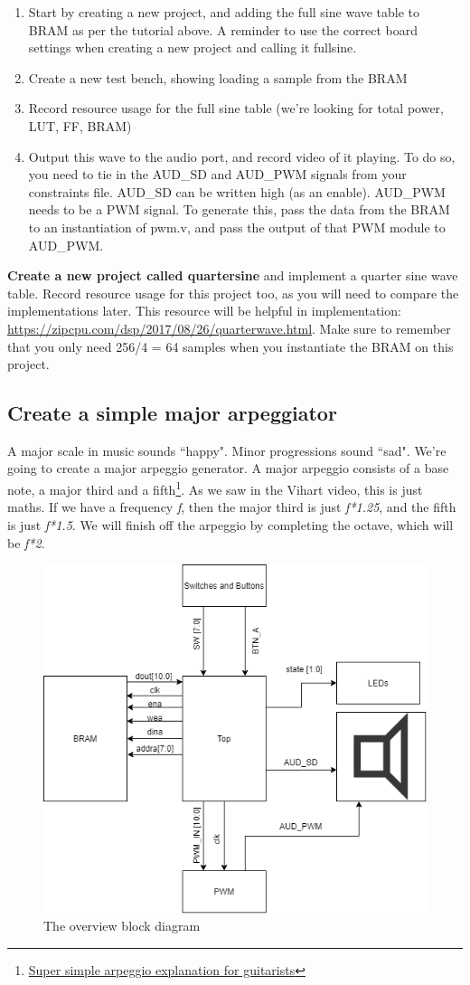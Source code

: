 \begin{enumerate}
    \item Start by creating a new project, and adding the full sine wave table to BRAM as per the tutorial above. A reminder to use the correct board settings when creating a new project and calling it fullsine.
    \item Create a new test bench, showing loading a sample from the BRAM
    \item Record resource usage for the full sine table (we're looking for total power, LUT, FF, BRAM)
    \item Output this wave to the audio port, and record video of it playing. To do so, you need to tie in the AUD\_SD and AUD\_PWM signals from your constraints file. AUD\_SD can be written high (as an enable). AUD\_PWM needs to be a PWM signal. To generate this, pass the data from the BRAM to an instantiation of pwm.v, and pass the output of that PWM module to AUD\_PWM.
\end{enumerate}
\textbf{Create a new project called quartersine} and implement a quarter sine wave table. Record resource usage for this project too, as you will need to compare the implementations later. This resource will be helpful in implementation: \href{https://zipcpu.com/dsp/2017/08/26/quarterwave.html}{https://zipcpu.com/dsp/2017/08/26/quarterwave.html}. Make sure to remember that you only need 256/4 = 64 samples when you instantiate the BRAM on this project.


\subsection{Create a simple major arpeggiator}
A major scale in music sounds ``happy". Minor progressions sound ``sad". We're going to create a major arpeggio generator.
A major arpeggio consists of a base note, a major third and a fifth\footnote{\href{https://www.superprof.com.au/blog/arpeggios-guitar-tips/}{Super simple arpeggio explanation for guitarists}}. As we saw in the Vihart video, this is just maths. If we have a frequency \textit{f}, then the major third is just \textit{f*1.25}, and the fifth is just \textit{f*1.5}. We will finish off the arpeggio by completing the octave, which will be \textit{f*2}.
\begin{figure}[H]
\centering
\includegraphics[width=0.6\columnwidth]{Figures/Prac5_BlockDiagram}
\caption{The overview block diagram}
\label{fig:prac5_block}
\end{figure}

